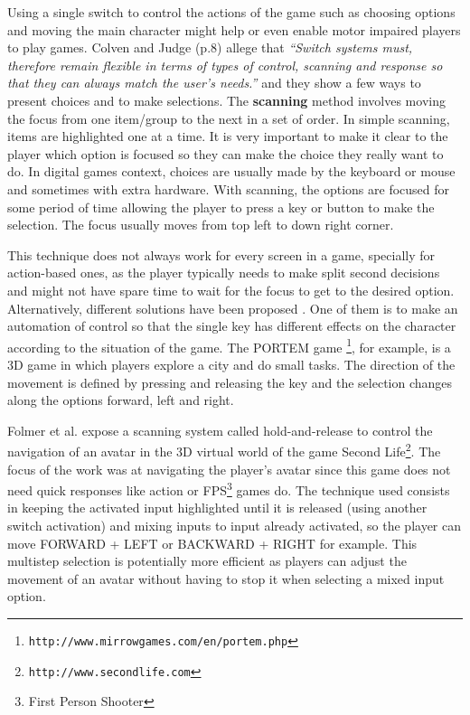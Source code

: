 \documentclass[a4paper]{sbgames}               %
\begin{document}
Using a single switch to control the actions of the game such as choosing options and moving the main character might help or even enable motor impaired players to play games. Colven and Judge (p.8)  allege that \textit{``Switch systems must, therefore remain flexible in terms of types of control, scanning and response so that they can always match the user's needs.''} and they show a few ways to present choices and to make selections. The \textbf{scanning} method involves moving the focus from one item/group to the next in a set of order. In simple scanning, items are highlighted one at a time. It is very important to make it clear to the player which option is focused so they can make the choice they really want to do. In digital games context, choices are usually made by the keyboard or mouse and sometimes with extra hardware. With scanning, the options are focused for some period of time allowing the player to press a key or button to make the selection. The focus usually moves from top left to down right corner.

This technique does not always work for every screen in a game, specially for action-based ones, as the player typically needs to make split second decisions and might not have spare time to wait for the focus to get to the desired option. Alternatively, different solutions have been proposed \cite{beukelman2005augmentative}. One of them is to make an automation of control so that the single key has different effects on the character according to the situation of the game. The PORTEM game \footnote{\nolinkurl{http://www.mirrowgames.com/en/portem.php}}, for example, is a 3D game in which players explore a city and do small tasks. The direction of the movement is defined by pressing and releasing the key and the selection changes along the options forward, left and right.

Folmer et al.  expose a scanning system called hold-and-release to control the navigation of an avatar in the 3D virtual world of the game Second Life\footnote{\nolinkurl{http://www.secondlife.com}}. The focus of the work was at navigating the player's avatar since this game does not need quick responses like action or FPS\footnote{First Person Shooter} games do. The technique used consists in keeping the activated input highlighted until it is released (using another switch activation) and mixing inputs to input already activated, so the player can move FORWARD + LEFT or BACKWARD + RIGHT for example. This multistep selection is potentially more efficient as players can adjust the movement of an avatar without having to stop it when selecting a mixed input option.
\end{document}
